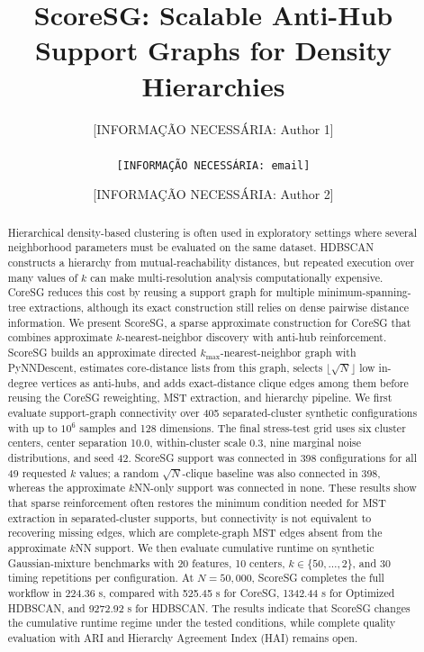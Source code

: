 \documentclass[11pt]{article}
\title{ScoreSG: Scalable Anti-Hub Support Graphs for Density Hierarchies}
\author{
  [INFORMAÇÃO NECESSÁRIA: Author 1]\\
  [INFORMAÇÃO NECESSÁRIA: Affiliation 1]\\
  \texttt{[INFORMAÇÃO NECESSÁRIA: email]}\\
  \and
  [INFORMAÇÃO NECESSÁRIA: Author 2]\\
  [INFORMAÇÃO NECESSÁRIA: Affiliation 2]
}
\date{}
\begin{document}
\maketitle

\begin{abstract}
Hierarchical density-based clustering is often used in exploratory settings where several neighborhood parameters must be evaluated on the same dataset. HDBSCAN constructs a hierarchy from mutual-reachability distances, but repeated execution over many values of \(k\) can make multi-resolution analysis computationally expensive. CoreSG reduces this cost by reusing a support graph for multiple minimum-spanning-tree extractions, although its exact construction still relies on dense pairwise distance information. We present ScoreSG, a sparse approximate construction for CoreSG that combines approximate \(k\)-nearest-neighbor discovery with anti-hub reinforcement. ScoreSG builds an approximate directed \(k_{\max}\)-nearest-neighbor graph with PyNNDescent, estimates core-distance lists from this graph, selects \(\lfloor\sqrt{N}\rfloor\) low in-degree vertices as anti-hubs, and adds exact-distance clique edges among them before reusing the CoreSG reweighting, MST extraction, and hierarchy pipeline. We first evaluate support-graph connectivity over 405 separated-cluster synthetic configurations with up to \(10^6\) samples and 128 dimensions. The final stress-test grid uses six cluster centers, center separation 10.0, within-cluster scale 0.3, nine marginal noise distributions, and seed 42. ScoreSG support was connected in 398 configurations for all 49 requested \(k\) values; a random \(\sqrt{N}\)-clique baseline was also connected in 398, whereas the approximate \(k\)NN-only support was connected in none. These results show that sparse reinforcement often restores the minimum condition needed for MST extraction in separated-cluster supports, but connectivity is not equivalent to recovering missing edges, which are complete-graph MST edges absent from the approximate \(k\)NN support. We then evaluate cumulative runtime on synthetic Gaussian-mixture benchmarks with 20 features, 10 centers, \(k \in \{50,\ldots,2\}\), and 30 timing repetitions per configuration. At \(N=50{,}000\), ScoreSG completes the full workflow in 224.36 s, compared with 525.45 s for CoreSG, 1342.44 s for Optimized HDBSCAN, and 9272.92 s for HDBSCAN. The results indicate that ScoreSG changes the cumulative runtime regime under the tested conditions, while complete quality evaluation with ARI and Hierarchy Agreement Index (HAI) remains open.
\end{abstract}
\end{document}
